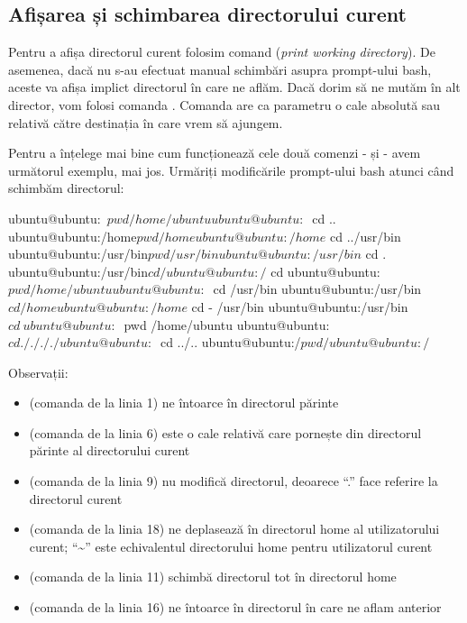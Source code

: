 \subsection{Afișarea și schimbarea directorului curent}
\label{sec:file-system-file-list-cd}

Pentru a afișa directorul curent folosim comand  (\textit{print working
directory}). De asemenea, dacă nu s-au efectuat manual schimbări asupra
prompt-ului bash, aceste va afișa implict directorul în care ne aflăm. Dacă
dorim să ne mutăm în alt director, vom folosi comanda . Comanda
 are ca parametru o cale absolută sau relativă către destinația în care
vrem să ajungem.

Pentru a înțelege mai bine cum funcționează cele două comenzi -  și
 - avem următorul exemplu, mai jos. Urmăriți modificările prompt-ului
bash atunci când schimbăm directorul:


\begin{screen}
ubuntu@ubuntu:~$ pwd
/home/ubuntu
ubuntu@ubuntu:~$ cd ..
ubuntu@ubuntu:/home$ pwd
/home
ubuntu@ubuntu:/home$ cd ../usr/bin
ubuntu@ubuntu:/usr/bin$ pwd
/usr/bin
ubuntu@ubuntu:/usr/bin$ cd .
ubuntu@ubuntu:/usr/bin$ cd /
ubuntu@ubuntu:/$ cd
ubuntu@ubuntu:~$ pwd
/home/ubuntu
ubuntu@ubuntu:~$ cd /usr/bin
ubuntu@ubuntu:/usr/bin$ cd /home
ubuntu@ubuntu:/home$ cd -
/usr/bin
ubuntu@ubuntu:/usr/bin$ cd ~
ubuntu@ubuntu:~$ pwd
/home/ubuntu
ubuntu@ubuntu:~$ cd ././././
ubuntu@ubuntu:~$ cd ../..
ubuntu@ubuntu:/$ pwd
/
ubuntu@ubuntu:/$
\end{screen}

Observații:
\begin{itemize}
	\item {} (comanda de la linia 1) ne întoarce în directorul
		părinte
	\item {} (comanda de la linia  6) este o cale
		relativă care pornește din directorul părinte al directorului
		curent
	\item {} (comanda de la linia  9) nu modifică directorul,
		deoarece “.” face referire la directorul curent
	\item {} (comanda de la linia  18) ne deplasează
		în directorul home al utilizatorului curent;  “\textasciitilde”
		este echivalentul directorului home pentru utilizatorul curent
	\item {} (comanda de la linia  11) schimbă directorul tot în
		directorul home
	\item {} (comanda de la linia  16) ne întoarce în directorul
		în care ne aflam anterior
\end{itemize}


